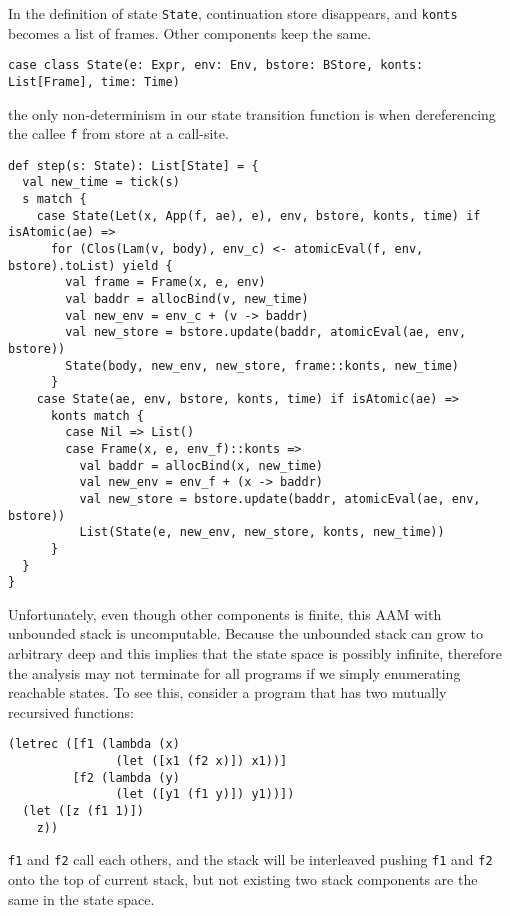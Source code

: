 \documentclass[acmsmall,review,anonymous]{acmart}\settopmatter{printfolios=true,printccs=false,printacmref=false}
\begin{document}
In the definition of state \texttt{State}, continuation store disappears, and
\texttt{konts} becomes a list of frames. Other components keep the same.

\begin{verbatim}
case class State(e: Expr, env: Env, bstore: BStore, konts: List[Frame], time: Time)
\end{verbatim}

the only non-determinism in our state transition function is when dereferencing
the callee \texttt{f} from store at a call-site.

\begin{verbatim}
def step(s: State): List[State] = {
  val new_time = tick(s)
  s match {
    case State(Let(x, App(f, ae), e), env, bstore, konts, time) if isAtomic(ae) =>
      for (Clos(Lam(v, body), env_c) <- atomicEval(f, env, bstore).toList) yield {
        val frame = Frame(x, e, env)
        val baddr = allocBind(v, new_time)
        val new_env = env_c + (v -> baddr)
        val new_store = bstore.update(baddr, atomicEval(ae, env, bstore))
        State(body, new_env, new_store, frame::konts, new_time)
      }
    case State(ae, env, bstore, konts, time) if isAtomic(ae) =>
      konts match {
        case Nil => List()
        case Frame(x, e, env_f)::konts =>
          val baddr = allocBind(x, new_time)
          val new_env = env_f + (x -> baddr)
          val new_store = bstore.update(baddr, atomicEval(ae, env, bstore))
          List(State(e, new_env, new_store, konts, new_time))
      }
  }
}
\end{verbatim}

Unfortunately, even though other components is finite, this AAM with unbounded stack is uncomputable. 
Because the unbounded stack can grow to arbitrary deep and this implies that the state space is possibly 
infinite, therefore the analysis may not terminate for all programs if we simply enumerating 
reachable states.
To see this, consider a program that has two mutually recursived functions:

\begin{verbatim}
(letrec ([f1 (lambda (x) 
               (let ([x1 (f2 x)]) x1))]
         [f2 (lambda (y)
               (let ([y1 (f1 y)]) y1))])
  (let ([z (f1 1)])
    z))
\end{verbatim}

\texttt{f1} and \texttt{f2} call each others, and the stack will be interleaved
pushing \texttt{f1} and \texttt{f2} onto the top of current stack, but not existing 
two stack components are the same in the state space.
\end{document}
